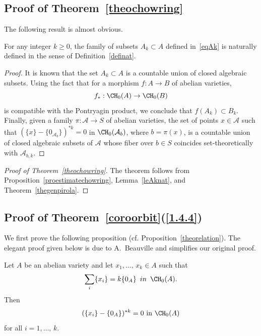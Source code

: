 \subsection{Proof of Theorem~\ref{theochowring}}\label{secnatdef}

The following result is almost obvious.

\begin{lemm}\label{leAknat}
For any integer $k\geq 0$, the family of subsets $A_k\subset A$ defined in~\eqref{eqAk} is naturally defined in the sense of Definition~\ref{definat}.
\end{lemm}

\begin{proof}
It is known that the set $A_k\subset A$ is a countable union of closed algebraic subsets.
Using the fact that for a morphism $f:A\rightarrow B$ of abelian varieties,
\[
f_*:\CH_0(A)\rightarrow \CH_0(B)
\]
is compatible with the Pontryagin product, we conclude that $f(A_k)\subset B_k$. Finally, given a family $\pi:\mathcal{A}\rightarrow S$ of abelian varieties, the set of points $x\in \mathcal{A}$ such that $(\{x\}-\{0_{\mathcal{A}_b}\})^{*k}=0$ in $\CH_0(\mathcal{A}_b)$, where $b=\pi(x)$, is a countable union of closed algebraic subsets of $\mathcal{A}$ whose fiber over $b\in S$ coincides set-theoretically with $\mathcal{A}_{b,k}$.
\end{proof}

\begin{proof}[Proof of Theorem~\ref{theochowring}]
The theorem follows from Proposition~\ref{proestimatechowring}, Lemma~\ref{leAknat}, and Theorem~\ref{thegenpirola}.
\end{proof}

\subsection{Proof of Theorem~\ref{coroorbit}\tMK(\ref{1.4.4})}\label{sectheoorbitoA}

We first prove the following proposition (cf. Proposition~\ref{theorelation}). The elegant proof given below is due to A.~Beauville and simplifies our original proof.

\begin{prop}\label{theorelation2}
Let $A$ be an abelian variety and let $x_1,\dots,\,x_k\in A$ such that
\begin{equation}\label{eqhypo}
\sum_i\{x_i\}=k\{0_A\}\,\,\, in \,\,\,\CH_0(A).
\end{equation}
Then
\begin{equation}\label{eqpoutheorrelation}
(\{x_i\}-\{0_A\})^{*k}=0 \text{ in }\CH_0(A)
\end{equation}
for all $i=1,\dots,\,k$.
\end{prop}

